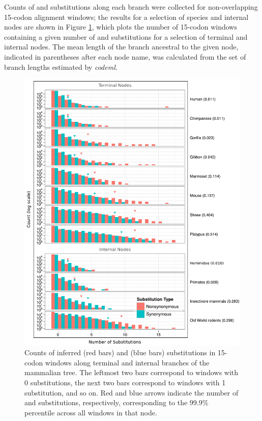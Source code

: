 Counts of \syn and \nsyn substitutions along each branch were
collected for non-overlapping 15-codon alignment windows; the results
for a selection of species and internal nodes are shown in Figure
\ref{fig_wcs}, which plots the number of 15-codon windows containing a
given number of \nsyn and \syn substitutions for a selection of
terminal and internal nodes. The mean length of the branch ancestral
to the given node, indicated in parentheses after each node name, was
calculated from the set of branch lengths estimated by \emph{codeml}.

\begin{figure}
\centering \includegraphics[scale=0.75]{Figs/wcs_15.pdf}
\caption{Counts of inferred \nsyn (red bars) and \syn (blue bars)
  substitutions in 15-codon windows along terminal and internal
  branches of the mammalian tree. The leftmost two bars correspond to
  windows with 0 substitutions, the next two bars correspond to
  windows with 1 substitution, and so on. Red and blue arrows indicate
  the number of \nsyn and \syn substitutions, respectively,
  corresponding to the 99.9\% percentile across all windows in that
  node.}
\label{fig_wcs}
\end{figure}

